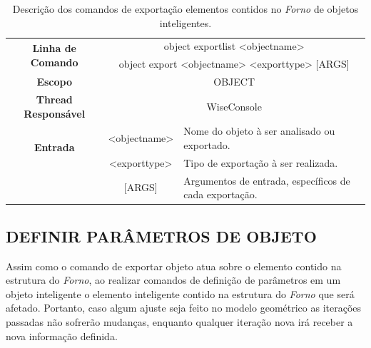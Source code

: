 \begin{center}
	\begin{table}[!htbp]
		\begin{tabularx}{\textwidth}{c|c|X}
			\toprule
			\multirow{2}{*}{\textbf{Linha de Comando}} & \multicolumn{2}{c}{object export\underline{\space\space}list <object\underline{\space\space}name>} \\
			& \multicolumn{2}{c}{object export <object\underline{\space\space}name> <export\underline{\space\space}type> [ARGS]} \\
			\midrule
			\textbf{Escopo} & \multicolumn{2}{c}{OBJECT} \\
			\hline
			\textbf{Thread Responsável} & \multicolumn{2}{c}{WiseConsole} \\
			\hline
			\multirow{2}{*}{\textbf{Entrada}} &  <object\underline{\space\space}name> & Nome do objeto à ser analisado ou exportado. \\
			&  <export\underline{\space\space}type> & Tipo de exportação à ser realizada. \\
			&  [ARGS] & Argumentos de entrada, específicos de cada exportação. \\
			\bottomrule
		\end{tabularx}
		\caption{Descrição dos comandos de exportação elementos contidos no \textit{Forno} de objetos inteligentes.}
		\label{tab:export_object}
	\end{table}
\end{center}

\subsection{DEFINIR PARÂMETROS DE OBJETO}\label{sec:set_field_object}

Assim como o comando de exportar objeto atua sobre o elemento contido na estrutura do \textit{Forno}, ao realizar comandos de definição de parâmetros em um objeto inteligente o elemento inteligente contido na estrutura do \textit{Forno} que será afetado. Portanto, caso algum ajuste seja feito no modelo geométrico as iterações passadas não sofrerão mudanças, enquanto qualquer iteração nova irá receber a nova informação definida.

